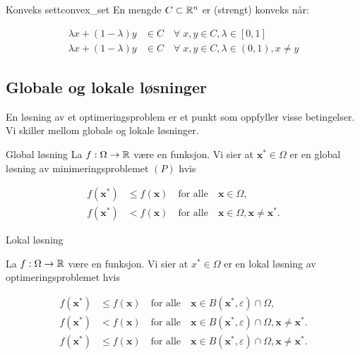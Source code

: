 \documentclass[10pt, a4paper]{article}
\begin{document}
\begin{definition}{Konveks sett}{convex_set}
  En mengde \(C \subset \mathbb{R}^n\) er (strengt) konveks når:

  \begin{align*}
    \lambda x + (1 - \lambda)y & \in C \quad \forall \; x, y \in C, \lambda \in [0, 1] \tag{Konveks}                   \\
    \lambda x + (1 - \lambda)y & \in C \quad \forall \; x, y \in C, \lambda \in (0, 1), x \neq y \tag{Strengt konveks}
  \end{align*}

\end{definition}


\subsection{Globale og lokale løsninger}

En løsning av et optimeringsproblem er et punkt som oppfyller visse betingelser.
Vi skiller mellom globale og lokale løsninger.

\begin{definition}{Global løsning}{}
  La \(f: \Omega \to \mathbb{R}\) være en funksjon. Vi sier at \(\symbf{x}^* \in \Omega\) er en global løsning av minimeringsproblemet \((P)\) hvis

  \begin{align*}
    f(\symbf{x}^*) & \leq f(\symbf{x}) \quad \text{for alle} \quad \symbf{x} \in \Omega, \tag{Global løsning}                                 \\
    f(\symbf{x}^*) & < f(\symbf{x}) \quad \text{for alle} \quad \symbf{x} \in \Omega, \symbf{x} \neq \symbf{x}^*. \tag{Streng global løsning}
  \end{align*}
\end{definition}

\begin{definition}{Lokal løsning}{}

  La \(f: \Omega \to \mathbb{R}\) være en funksjon. Vi sier at \(x^* \in \Omega\) er en lokal løsning av optimeringsproblemet hvis

  \begin{align*}
    f(\symbf{x}^*) & \leq f(\symbf{x}) \quad \text{for alle} \quad \symbf{x} \in B(\symbf{x}^*, \varepsilon) \cap \Omega, \tag{Lokal løsning}                                     \\
    f(\symbf{x}^*) & < f(\symbf{x}) \quad \text{for alle} \quad \symbf{x} \in B(\symbf{x}^*, \varepsilon) \cap \Omega, \symbf{x} \neq \symbf{x}^*. \tag{Streng lokal løsning}     \\
    f(\symbf{x}^*) & \leq f(\symbf{x}) \quad \text{for alle} \quad \symbf{x} \in B(\symbf{x}^*, \varepsilon) \cap \Omega, \symbf{x} \neq \symbf{x}^*. \tag{Isolert lokal løsning}
  \end{align*}
\end{definition}
\end{document}
